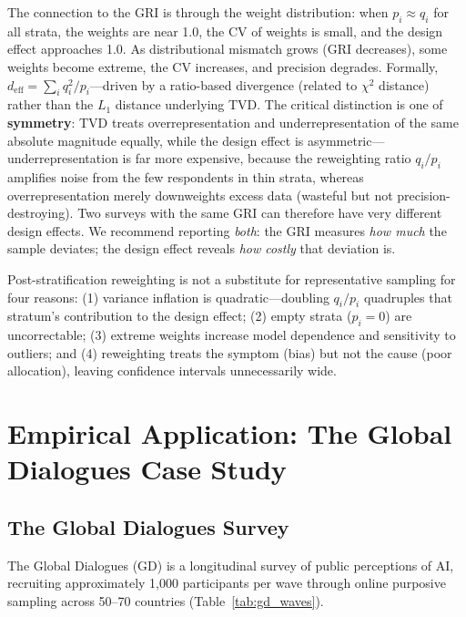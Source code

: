 \documentclass[11pt,a4paper]{article}
\begin{document}
The connection to the GRI is through the weight distribution: when $p_i \approx q_i$ for all strata, the weights are near 1.0, the CV of weights is small, and the design effect approaches 1.0. As distributional mismatch grows (GRI decreases), some weights become extreme, the CV increases, and precision degrades. Formally, $d_{\text{eff}} = \sum_i q_i^2 / p_i$---driven by a ratio-based divergence (related to $\chi^2$ distance) rather than the $L_1$ distance underlying TVD. The critical distinction is one of \textbf{symmetry}: TVD treats overrepresentation and underrepresentation of the same absolute magnitude equally, while the design effect is asymmetric---underrepresentation is far more expensive, because the reweighting ratio $q_i/p_i$ amplifies noise from the few respondents in thin strata, whereas overrepresentation merely downweights excess data (wasteful but not precision-destroying). Two surveys with the same GRI can therefore have very different design effects. We recommend reporting \emph{both}: the GRI measures \emph{how much} the sample deviates; the design effect reveals \emph{how costly} that deviation is.

Post-stratification reweighting is not a substitute for representative sampling for four reasons: (1) variance inflation is quadratic---doubling $q_i/p_i$ quadruples that stratum's contribution to the design effect; (2) empty strata ($p_i = 0$) are uncorrectable; (3) extreme weights increase model dependence and sensitivity to outliers; and (4) reweighting treats the symptom (bias) but not the cause (poor allocation), leaving confidence intervals unnecessarily wide.

\section{Empirical Application: The Global Dialogues Case Study}

\subsection{The Global Dialogues Survey}

The Global Dialogues (GD) is a longitudinal survey of public perceptions of AI, recruiting approximately 1,000 participants per wave through online purposive sampling across 50--70 countries (Table~\ref{tab:gd_waves}).
\end{document}
